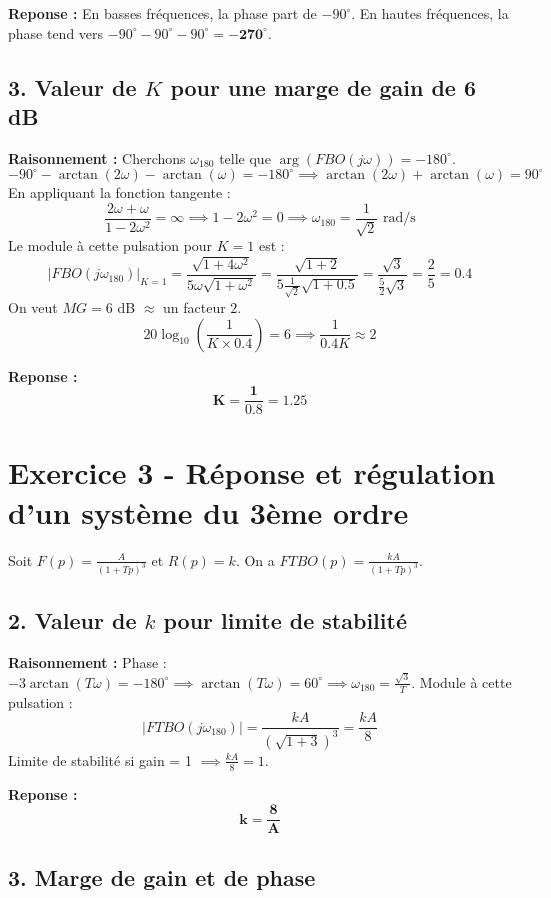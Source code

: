 \documentclass[11pt,a4paper]{article}
\begin{document}
\textbf{Reponse :} En basses fréquences, la phase part de $-90^\circ$. En hautes fréquences, la phase tend vers $-90^\circ - 90^\circ - 90^\circ = \mathbf{-270^\circ}$.

\subsection*{3. Valeur de $K$ pour une marge de gain de 6 dB}

\textbf{Raisonnement :} Cherchons $\omega_{180}$ telle que $\arg(FBO(j\omega)) = -180^\circ$.
$$ -90^\circ - \arctan(2\omega) - \arctan(\omega) = -180^\circ \implies \arctan(2\omega) + \arctan(\omega) = 90^\circ $$
En appliquant la fonction tangente :
$$ \frac{2\omega + \omega}{1 - 2\omega^2} = \infty \implies 1 - 2\omega^2 = 0 \implies \omega_{180} = \frac{1}{\sqrt{2}} \text{ rad/s} $$
Le module à cette pulsation pour $K=1$ est :
$$ |FBO(j\omega_{180})|_{K=1} = \frac{\sqrt{1+4\omega^2}}{5\omega\sqrt{1+\omega^2}} = \frac{\sqrt{1+2}}{5\frac{1}{\sqrt{2}}\sqrt{1+0.5}} = \frac{\sqrt{3}}{\frac{5}{2}\sqrt{3}} = \frac{2}{5} = 0.4 $$
On veut $MG = 6$ dB $\approx$ un facteur $2$.
$$ 20\log_{10}\left(\frac{1}{K \times 0.4}\right) = 6 \implies \frac{1}{0.4 K} \approx 2 $$

\textbf{Reponse :} 
$$ \mathbf{K = \frac{1}{0.8} = 1.25} $$

\hrulefill

\section*{Exercice 3 - Réponse et régulation d'un système du 3ème ordre}

Soit $F(p) = \frac{A}{(1+Tp)^3}$ et $R(p) = k$.
On a $FTBO(p) = \frac{kA}{(1+Tp)^3}$.

\subsection*{2. Valeur de $k$ pour limite de stabilité}

\textbf{Raisonnement :} Phase : $-3\arctan(T\omega) = -180^\circ \implies \arctan(T\omega) = 60^\circ \implies \omega_{180} = \frac{\sqrt{3}}{T}$.
Module à cette pulsation :
$$ |FTBO(j\omega_{180})| = \frac{kA}{(\sqrt{1+3})^3} = \frac{kA}{8} $$
Limite de stabilité si gain = 1 $\implies \frac{kA}{8} = 1$.

\textbf{Reponse :} 
$$ \mathbf{k = \frac{8}{A}} $$

\subsection*{3. Marge de gain et de phase}
\end{document}
